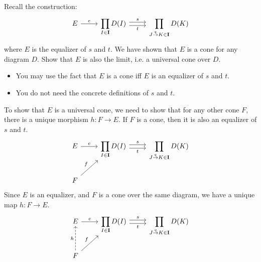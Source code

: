 \begin{exercise}
  Recall the construction:
  \[
    \begin{tikzcd}
      E \arrow{r}{e} &
      \displaystyle \prod_{I \in \bf{I}} D(I) \arrow[r,shift left, "s"] \arrow[r,shift right,swap,"t"] &
      \displaystyle \prod_{J \overset{q}{\to} K \in \bf{I}} D(K)
    \end{tikzcd}
  \]
  where $E$ is the equalizer of $s$ and $t$.
  We have shown that $E$ is a cone for any diagram $D$. Show that $E$ is also the limit,
  i.e. a universal cone over $D$.
\end{exercise}
\begin{hint}
  \begin{itemize}
  \item You may use the fact that $E$ is a cone iff $E$ is an equalizer of $s$ and $t$.
  \item You do not need the concrete definitions of $s$ and $t$.
  \end{itemize}
\end{hint}
\begin{answer}
  To show that $E$ is a universal cone, we need to show that for any other cone $F$, there is a unique 
  morphism $h : F \to E$.
  If $F$ is a cone, then it is also an equalizer of $s$ and $t$.
  \[
    \begin{tikzcd}
      E \arrow{r}{e} &
      \displaystyle \prod_{I \in \bf{I}} D(I) \arrow[r,shift left, "s"] \arrow[r,shift right,swap,"t"] &
      \displaystyle \prod_{J \overset{q}{\to} K \in \bf{I}} D(K) \\
      F \arrow{ur}{f} & &
    \end{tikzcd}
  \]
  Since $E$ is an equalizer, and $F$ is a cone over the same diagram, we have a unique map $h : F \to E$.
  \[
    \begin{tikzcd}
      E \arrow{r}{e} &
      \displaystyle \prod_{I \in \bf{I}} D(I) \arrow[r,shift left, "s"] \arrow[r,shift right,swap,"t"] &
      \displaystyle \prod_{J \overset{q}{\to} K \in \bf{I}} D(K) \\
      F \arrow{ur}{f} \arrow[dashed]{u}{h} & &
    \end{tikzcd}
  \]


\end{answer}



